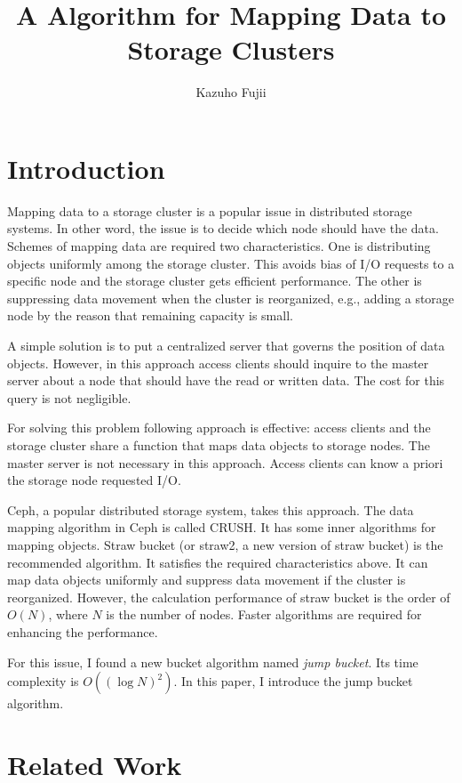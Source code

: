 \documentclass[a4paper,11pt]{article}
\title{A Algorithm for Mapping Data to Storage Clusters}
\author{Kazuho Fujii}
\date{}
\begin{document}
\maketitle

\section{Introduction}

Mapping data to a storage cluster is a popular issue in distributed storage systems.
In other word, the issue is to decide which node should have the data.
Schemes of mapping data are required two characteristics.
One is distributing objects uniformly among the storage cluster.
This avoids bias of I/O requests to a specific node and the storage cluster gets efficient performance.
The other is suppressing data movement when the cluster is reorganized, e.g., adding a storage node by the reason that remaining capacity is small.

A simple solution is to put a centralized server that governs the position of data objects.
However, in this approach access clients should inquire to the master server about a node
that should have the read or written data.
The cost for this query is not negligible.

For solving this problem following approach is effective:
access clients and the storage cluster share a function that maps data objects to storage nodes.
The master server is not necessary in this approach.
Access clients can know a priori the storage node requested I/O.

Ceph\cite{ceph}, a popular distributed storage system, takes this approach.
The data mapping algorithm in Ceph is called CRUSH\cite{crush}.
It has some inner algorithms for mapping objects.
Straw bucket (or straw2, a new version of straw bucket) is the recommended algorithm.
It satisfies the required characteristics above.
It can map data objects uniformly and suppress data movement if the cluster is reorganized.
However, the calculation performance of straw bucket is the order of $O(N)$, where $N$ is the number of nodes.
Faster algorithms are required for enhancing the performance.

For this issue, I found a new bucket algorithm named {\it jump bucket}.
Its time complexity is $O((\log N)^2)$.
In this paper, I introduce the jump bucket algorithm.

\section{Related Work}
\end{document}
